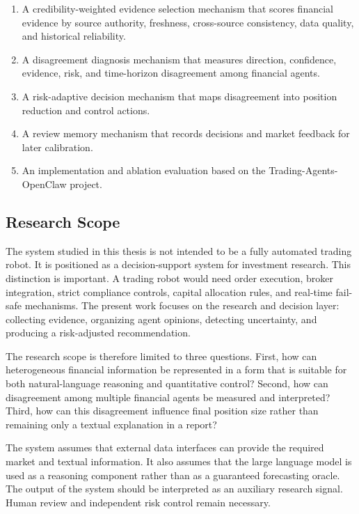 \documentclass[14pt,a4paper]{extarticle}
\begin{document}
\begin{enumerate}[label=\arabic*)]
  \item A credibility-weighted evidence selection mechanism that scores financial evidence by source authority, freshness, cross-source consistency, data quality, and historical reliability.
  \item A disagreement diagnosis mechanism that measures direction, confidence, evidence, risk, and time-horizon disagreement among financial agents.
  \item A risk-adaptive decision mechanism that maps disagreement into position reduction and control actions.
  \item A review memory mechanism that records decisions and market feedback for later calibration.
  \item An implementation and ablation evaluation based on the Trading-Agents-OpenClaw project.
\end{enumerate}

\subsection{Research Scope}

The system studied in this thesis is not intended to be a fully automated trading robot. It is positioned as a decision-support system for investment research. This distinction is important. A trading robot would need order execution, broker integration, strict compliance controls, capital allocation rules, and real-time fail-safe mechanisms. The present work focuses on the research and decision layer: collecting evidence, organizing agent opinions, detecting uncertainty, and producing a risk-adjusted recommendation.

The research scope is therefore limited to three questions. First, how can heterogeneous financial information be represented in a form that is suitable for both natural-language reasoning and quantitative control? Second, how can disagreement among multiple financial agents be measured and interpreted? Third, how can this disagreement influence final position size rather than remaining only a textual explanation in a report?

The system assumes that external data interfaces can provide the required market and textual information. It also assumes that the large language model is used as a reasoning component rather than as a guaranteed forecasting oracle. The output of the system should be interpreted as an auxiliary research signal. Human review and independent risk control remain necessary.
\end{document}

